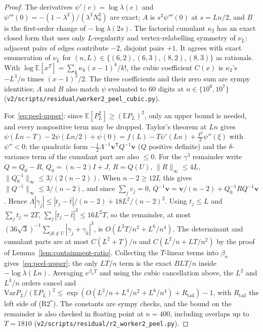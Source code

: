 \documentclass[11pt]{article}
\newcommand{\EE}{\mathbb{E}}
\newcommand{\Var}{\mathrm{Var}}
\begin{document}
\begin{proof}
The derivatives \(\psi'(e)=\log\lambda(e)\) and
\(\psi'''(0)=-(1-\lambda^2)/(\lambda^2N_0^2)\) are exact; \(A\) is
\(s^3\psi'''(0)\) at \(s=Ln/2\), and \(B\) is the first-order change of
\(-\log\lambda(2s)\). The factorial cumulant \(\kappa_2\) has an exact closed form
that uses only \(L\)-regularity and vertex-relabelling symmetry of \(\nu_L\):
adjacent pairs of edges contribute \(-2\), disjoint pairs \(+1\). It agrees with
exact enumeration of \(\nu_L\) for \((n,L)\in\{(6,2),(6,3),(8,2),(8,3)\}\) as
rationals. With \(\log\EE[x^T]=\sum_k\kappa_k(x-1)^k/k!\), the cubic coefficient
\(C(x)\) is \(\kappa_2\)'s \(-L^3/n\) times \((x-1)^2/2\). The three coefficients
and their zero sum are sympy identities; \(A\) and \(B\) also match \(\psi\) evaluated
to \(60\) digits at \(n\in\{10^6,10^7\}\)
(\texttt{v2/scripts/residual/worker2\_peel\_cubic.py}).

For~\eqref{eq:peel-upper}: since \(\EE[P_L^2]\ge(\EE P_L)^2\), only an upper bound
is needed, and every nonpositive term may be dropped. Taylor's theorem at \(Ln\)
gives \(\psi(Ln-T)-2\psi(Ln/2)+\psi(0)=f(L)-T\psi'(Ln)+\tfrac{T^2}2\psi''(\xi)\) with
\(\psi''<0\); the quadratic form \(-\tfrac12\Lambda^{-1}\boldsymbol v^{\mathsf T}Q^{-1}\boldsymbol v\)
(\(Q\) positive definite) and the \(\delta\)-variance term of the cumulant part
are also \(\le0\). For the \(\gamma^3\) remainder write \(Q=Q_0-R\),
\(Q_0=(n-2)I+J\), \(R=Q(U)\), \(\|R\|_\infty\le4L\), \(\|Q_0^{-1}\|_\infty\le3/(2(n-2))\).
When \(n-2\ge12L\) this gives \(\|Q^{-1}\|_\infty\le3/(n-2)\), and since
\(\sum_jv_j=0\), \(Q^{-1}\boldsymbol v=\boldsymbol v/(n-2)+Q_0^{-1}RQ^{-1}\boldsymbol v\). Hence
\(\Lambda|\gamma_j|\le|t_j-\bar t|/(n-2)+18L^2/(n-2)^2\). Using \(t_j\le L\) and
\(\sum_jt_j=2T\), \(\sum_j|t_j-\bar t|^3\le16L^2T\), so the remainder, at most
\((36\sqrt3)^{-1}\sum_{jk\notin U}|\gamma_j+\gamma_k|^3\), is
\(O(L^2T/n^2+L^6/n^4)\). The determinant and cumulant parts are at most
\(C(L^2+T)/n\) and \(C(L^2/n+LT/n^2)\) by the proof of
Lemma~\ref{lem:containment-ratio}. Collecting the \(T\)-linear terms into
\(\beta_n\) gives~\eqref{eq:peel-upper}; the only \(LT/n\) term is the exact
\(BLT/n\) inside \(-\log\lambda(Ln)\). Averaging \(e^{\beta_nT}\) and using the
cubic cancellation above, the \(L^2\) and \(L^3/n\) orders cancel and
\(\Var P_L/(\EE P_L)^2\le\exp(O(L^2/n+L^4/n^2+L^6/n^4)+R_{\mathrm{tail}})-1\), with
\(R_{\mathrm{tail}}\) the left side of (R2\(^*\)). The constants are sympy checks,
and the bound on the remainder is also checked in floating point at \(n=400\),
including overlaps up to \(T=1810\)
(\texttt{v2/scripts/residual/r2\_worker2\_peel.py}).
\end{proof}
\end{document}
